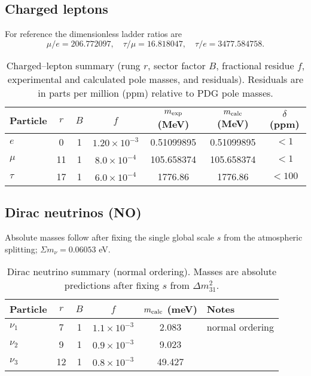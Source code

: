 \documentclass[%
 amsmath,amssymb,
 aps,
prb,
floatfix, showkeys
]{revtex4-2}
\begin{document}
\subsection{Charged leptons}
For reference the dimensionless ladder ratios are
\[
\mu/e=206.772097,\quad \tau/\mu=16.818047,\quad \tau/e=3477.584758.
\]
\begin{table}[H]
\caption{Charged--lepton summary (rung $r$, sector factor $B$, fractional residue $f$, experimental and calculated pole masses, and residuals). Residuals are in parts per million (ppm) relative to PDG pole masses.}
\label{tab:leptons}
\begin{tabular}{l c c c c c c}
\hline
Particle & $r$ & $B$ & $f$ & $m_{\rm exp}$ (MeV) & $m_{\rm calc}$ (MeV) & $\delta$ (ppm) \\
\hline
$e$   & 0  & 1 & $1.20\times10^{-3}$ & 0.51099895 & 0.51099895 & $<\!1$ \\
$\mu$ & 11 & 1 & $8.0\times10^{-4}$ & 105.658374 & 105.658374 & $<\!1$ \\
$\tau$& 17 & 1 & $6.0\times10^{-4}$ & 1776.86 & 1776.86 & $<\!100$ \\
\hline
\end{tabular}
\end{table}

\subsection{Dirac neutrinos (NO)}
Absolute masses follow after fixing the single global scale $s$ from the atmospheric splitting; $\Sigma m_\nu\!=\!0.06053$ eV.
\begin{table}[H]
\caption{Dirac neutrino summary (normal ordering). Masses are absolute predictions after fixing $s$ from $\Delta m^2_{31}$.}
\label{tab:neutrinos}
\begin{tabular}{l c c c c l}
\hline
Particle & $r$ & $B$ & $f$ & $m_{\rm calc}$ (meV) & Notes \\
\hline
$\nu_1$ & 7  & 1 & $1.1\times10^{-3}$ & 2.083 & normal ordering \\
$\nu_2$ & 9  & 1 & $0.9\times10^{-3}$ & 9.023 &  \\
$\nu_3$ & 12 & 1 & $0.8\times10^{-3}$ & 49.427 &  \\
\hline
\end{tabular}
\end{table}
\end{document}
